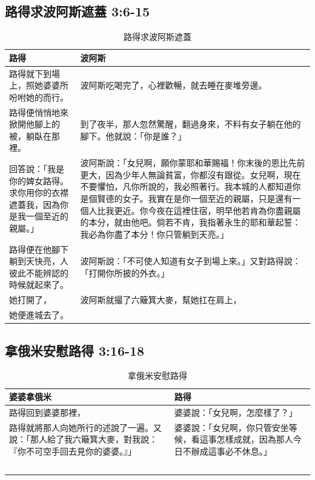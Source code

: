 \subsection{路得求波阿斯遮蓋 3:6-15}
\begin{table}[H]
\centering
\begin{tabular}{p{6.7cm}|p{10.3cm}}\hline
路得&波阿斯\\\hline
路得就下到場上，照她婆婆所吩咐她的而行。&波阿斯吃喝完了，心裡歡暢，就去睡在麥堆旁邊。\\\hline
路得便悄悄地來掀開他腳上的被，躺臥在那裡。&到了夜半，那人忽然驚醒，翻過身來，不料有女子躺在他的腳下。他就說：「你是誰？」\\\hline
回答說：「我是你的婢女路得。求你用你的衣襟遮蓋我，因為你是我一個至近的親屬。」 &波阿斯說：「女兒啊，願你蒙耶和華賜福！你末後的恩比先前更大，因為少年人無論貧富，你都沒有跟從。女兒啊，現在不要懼怕，凡你所說的，我必照著行。我本城的人都知道你是個賢德的女子。我實在是你一個至近的親屬，只是還有一個人比我更近。你今夜在這裡住宿，明早他若肯為你盡親屬的本分，就由他吧。倘若不肯，我指著永生的耶和華起誓：我必為你盡了本分！你只管躺到天亮。」\\\hline
路得便在他腳下躺到天快亮，人彼此不能辨認的時候就起來了。&波阿斯說：「不可使人知道有女子到場上來。」又對路得說：「打開你所披的外衣。」\\\hline
她打開了，&波阿斯就撮了六簸箕大麥，幫她扛在肩上，\\\hline
她便進城去了。&\\\hline
\end{tabular}
\caption{路得求波阿斯遮蓋}
\end{table} 

\subsection{拿俄米安慰路得 3:16-18}
\begin{table}[H]
\centering
\begin{tabular}{p{8.5cm}|p{8.7cm}}\hline
婆婆拿俄米&路得\\\hline
路得回到婆婆那裡，&婆婆說：「女兒啊，怎麼樣了？」\\\hline
路得就將那人向她所行的述說了一遍。又說：「那人給了我六簸箕大麥，對我說：『你不可空手回去見你的婆婆。』」 &婆婆說：「女兒啊，你只管安坐等候，看這事怎樣成就，因為那人今日不辦成這事必不休息。」\\\hline
 \end{tabular}
\caption{拿俄米安慰路得}
\end{table} 


